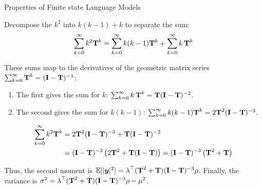 \begin{question}{Properties of Finite state Language Models}
\begin{subquestion}
Decompose the $k^2$ into $k(k-1) + k$ to separate the sum:
\begin{equation}
    \sum_{k=0}^{\infty} k^2 \transMtx^k = \sum_{k=0}^{\infty} k(k-1) \transMtx^k + \sum_{k=0}^{\infty} k\, \transMtx^k
\end{equation}

These sums map to the derivatives of the geometric matrix series $\sum_{k=0}^{\infty} \transMtx^k = (\mathbf{I} - \transMtx)^{-1}$:
\begin{enumerate}
    \item The first gives the sum for $k$: $\sum_{k=0}^{\infty} k\, \transMtx^k = \transMtx (\mathbf{I} - \transMtx)^{-2}$.
    \item The second gives the sum for $k(k-1)$: $\sum_{k=0}^{\infty} k(k-1) \transMtx^k = 2\transMtx^2 (\mathbf{I} - \transMtx)^{-3}$.
\end{enumerate}

\begin{align}
    \sum_{k=0}^{\infty} k^2 \transMtx^k &= 2\transMtx^2(\mathbf{I} - \transMtx)^{-3} + \transMtx(\mathbf{I} - \transMtx)^{-2} \\
    &= (\mathbf{I} - \transMtx)^{-3} \left(2\transMtx^2 + \transMtx(\mathbf{I} - \transMtx)\right) = (\mathbf{I} - \transMtx)^{-3} \left(\transMtx^2 + \transMtx\right)
\end{align}

Thus, the second moment is $\expectation[|\str|^2] = \initf^\top (\transMtx^2 + \transMtx) (\mathbf{I} - \transMtx)^{-3} \finalf$.
Finally, the variance is $\sigma^2 =  \initf^\top (\transMtx^2 + \transMtx) (\mathbf{I} - \transMtx)^{-3} \finalf - \mu^2$.


\end{subquestion}
\end{question}

